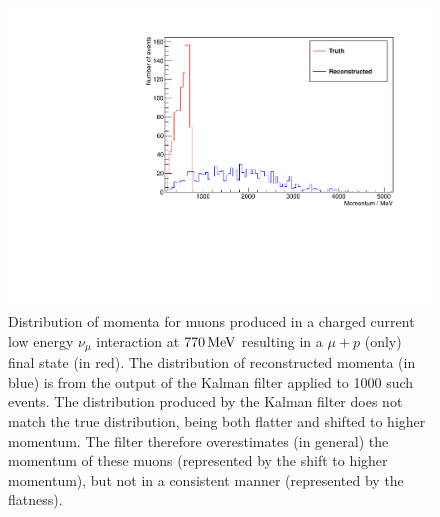 \begin{figure}
\centering
\includegraphics[angle=-90,width=\textwidth]{chapters/trackfitting_images/kalman-ccqe-low}
\caption[True and reconstructed muon momentum distributions for $E_\nu=770\MeV$]{\label{fig:kalman-ccqe-low}Distribution of momenta for muons produced in a charged current low energy $\nu_\mu$ interaction at $770\,\mathrm{MeV}$ resulting in a $\mu + p$ (only) final state (in red). The distribution of reconstructed momenta (in blue) is from the output of the Kalman filter applied to 1000 such events. The distribution produced by the Kalman filter does not match the true distribution, being both flatter and shifted to higher momentum. The filter therefore overestimates (in general) the momentum of these muons (represented by the shift to higher momentum), but not in a consistent manner (represented by the flatness).}
\end{figure}

